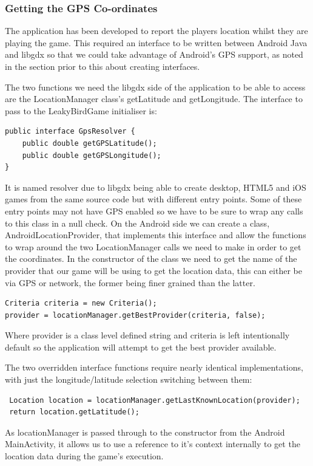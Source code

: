 \subsubsection{Getting the GPS Co-ordinates}
\label{getting-gps-coords}
The application has been developed to report the players location whilst they are playing the game. This required an interface to be written between Android Java and libgdx so that we could take advantage of Android's GPS support, as noted in the section prior to this about creating interfaces.

The two functions we need the libgdx side of the application to be able to access are the LocationManager class's getLatitude and getLongitude. The interface to pass to the LeakyBirdGame initialiser is:
\begin{verbatim}
public interface GpsResolver {
    public double getGPSLatitude();
    public double getGPSLongitude();
}
\end{verbatim}
It is named resolver due to libgdx being able to create desktop, HTML5 and iOS games from the same source code but with different entry points. Some of these entry points may not have GPS enabled so we have to be sure to wrap any calls to this class in a null check. On the Android side we can create a class, AndroidLocationProvider,  that implements this interface and allow the functions to wrap around the two LocationManager calls we need to make in order to get the coordinates. In the constructor of the class we need to get the name of the provider that our game will be using to get the location data, this can either be via GPS or network, the former being finer grained than the latter.
\begin{verbatim}
Criteria criteria = new Criteria();
provider = locationManager.getBestProvider(criteria, false);
\end{verbatim}
Where provider is a class level defined string and criteria is left intentionally default so the application will attempt to get the best provider available.

The two overridden interface functions require nearly identical implementations, with just the longitude/latitude selection switching between them:
\begin{verbatim}
 Location location = locationManager.getLastKnownLocation(provider);
 return location.getLatitude();
\end{verbatim}
As locationManager is passed through to the constructor from the Android MainActivity, it allows us to use a reference to it’s context internally to get the location data during the game’s execution.


